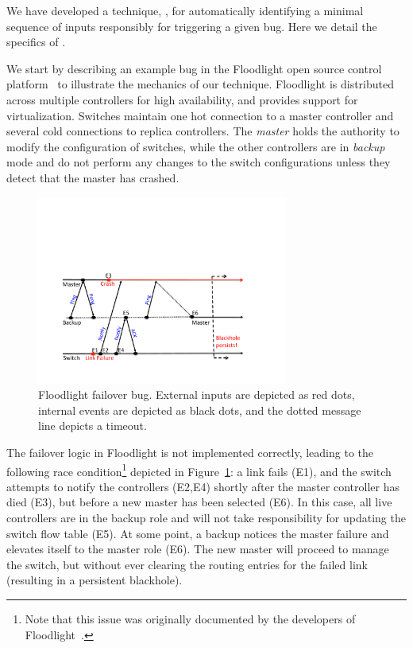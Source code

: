 
We have developed a technique, \simulator, for automatically identifying
a minimal sequence of inputs responsibly for triggering a given
bug. Here we detail the specifics of \simulator.

We start by describing an example bug in the Floodlight
open source control platform~\cite{floodlight_bug} to illustrate the mechanics
of our technique. Floodlight is distributed across
multiple controllers for high availability, and provides support for
virtualization. Switches maintain one hot connection to a master controller and
several cold connections to replica controllers. The \emph{master} holds the
authority to modify the configuration of switches, while the other
controllers are in \emph{backup} mode and do not perform any changes to the
switch configurations unless they detect that the master has crashed.

\begin{figure}[t]
    \includegraphics[width=3.25in]{../diagrams/case_study/example_bug.pdf}
    \caption[]{\label{fig:example} Floodlight failover bug. External inputs
               are depicted as red dots, internal events are depicted as black
               dots, and the dotted message line depicts a timeout.}
\end{figure}

The failover logic in Floodlight is not implemented correctly, leading to the
following race condition\footnote{Note that this issue was
originally documented by the developers of Floodlight~\cite{floodlight_bug}.} depicted in
Figure~\ref{fig:example}:
a link fails (E1), and the switch attempts to notify the controllers (E2,E4) shortly after the master
controller has died (E3), but before a new master has been selected (E6). In this case, all live controllers are in
the backup role and will not take responsibility for updating the switch
flow table (E5). At some point, a backup notices the master failure and
elevates itself to the master role (E6). The new master will proceed to manage
the switch, but without ever clearing the routing entries for
the failed link (resulting in a persistent blackhole).

